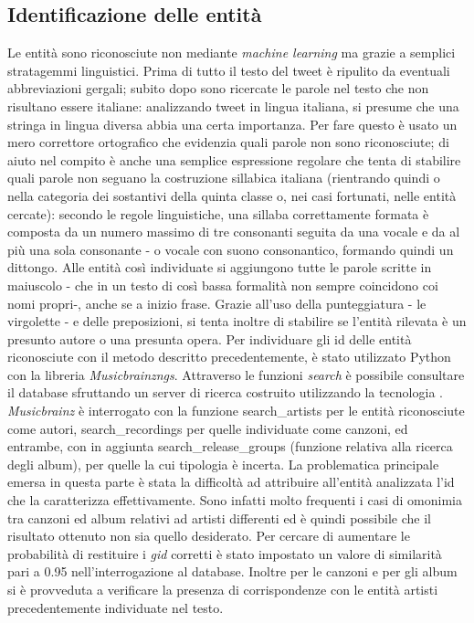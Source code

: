\documentclass[12pt, a4paper, twocolumn]{article} %
\begin{document}
\subsection{Identificazione delle entità}
Le entità sono riconosciute non mediante \textit{machine learning} ma grazie a semplici stratagemmi linguistici.
Prima di tutto il testo del tweet è ripulito da eventuali abbreviazioni gergali; subito dopo sono ricercate le parole nel testo che non risultano essere italiane: analizzando tweet in lingua italiana, si presume che una stringa in lingua diversa abbia una certa importanza.
Per fare questo è usato un mero correttore ortografico che evidenzia quali parole non sono riconosciute; di aiuto nel compito è anche una semplice espressione regolare che tenta di stabilire quali parole non seguano la costruzione sillabica italiana (rientrando quindi o nella categoria dei sostantivi della quinta classe o, nei casi fortunati, nelle entità cercate): secondo le regole linguistiche, una sillaba correttamente formata è composta da un numero massimo di tre consonanti seguita da una vocale e da al più una sola consonante - o vocale con suono consonantico, formando quindi un dittongo.
Alle entità così individuate si aggiungono tutte le parole scritte in maiuscolo - che in un testo di così bassa formalità non sempre coincidono coi nomi propri-, anche se a inizio frase.
Grazie all'uso della punteggiatura - le virgolette - e delle preposizioni, si tenta inoltre di stabilire se l'entità rilevata è un presunto autore o una presunta opera.
Per individuare gli id delle entità riconosciute con il metodo descritto precedentemente, è stato utilizzato Python con la libreria \textit{Musicbrainzngs}.
Attraverso le funzioni \textit{search} è possibile consultare il database sfruttando un server di ricerca costruito utilizzando la tecnologia .
\textit{Musicbrainz} è interrogato con la funzione search\_artists per le entità riconosciute come autori, search\_recordings per quelle individuate come canzoni, ed entrambe, con in aggiunta search\_release\_groups (funzione relativa alla ricerca degli album), per quelle la cui tipologia è incerta.
La problematica principale emersa in questa parte è stata la difficoltà ad attribuire all’entità analizzata l’id che la caratterizza effettivamente.
Sono infatti molto frequenti i casi di omonimia tra canzoni ed album relativi ad artisti differenti ed è quindi possibile che il risultato ottenuto non sia quello desiderato.
Per cercare di aumentare le probabilità di restituire i \textit{gid} corretti è stato impostato un valore di similarità pari a 0.95 nell’interrogazione al database. Inoltre per le canzoni e per gli album si è provveduta a verificare la presenza di corrispondenze con le entità artisti precedentemente individuate nel testo.
\end{document}
